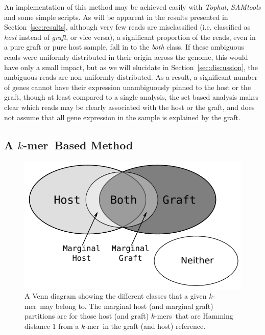 \documentclass{bioinfo}
\newcommand{\Tophat}{\textit{Tophat}{}}
\newcommand{\kmer}{$k$-mer{}}
\newcommand{\kmers}{$k$-mers{}}
\begin{document}
An implementation of this method may be achieved easily
with \Tophat, \textit{SAMtools} \citep{Li:2009p29406} and some simple scripts. 
As will be apparent in
the results presented in Section~\ref{sec:results}, although very few
reads are misclassified (i.e. classified as \textit{host} instead of
\textit{graft}, or vice versa), a significant proportion of the reads,
even in a pure graft or pure host sample, fall in to the \textit{both}
class.
If these ambiguous reads were uniformly distributed in their origin
across the genome, this would have only a small impact, but as we will
elucidate in Section~\ref{sec:discussion}, the ambiguous reads are
non-uniformly distributed.
As a result, a significant number of genes cannot have their expression
unambiguously pinned to the host or the graft, though at least compared
to a single analysis, the set based analysis makes clear which reads
may be clearly associated with the host or the graft, and does not assume
that all gene expression in the sample is explained by the graft.

\subsection{ A \kmer\ Based Method}
\label{sec:xenome}

\begin{figure}
\begin{center}
\includegraphics[scale=0.7]{venn.pdf}
\end{center}
\caption{A Venn diagram showing the different classes that a given \kmer\ 
may belong to.  The marginal host (and marginal graft) partitions are
for those host (and graft) \kmers\ that are Hamming distance 1 from a
\kmer\ in the graft (and host) reference.}
\label{fig:venn}
\end{figure}
\end{document}
